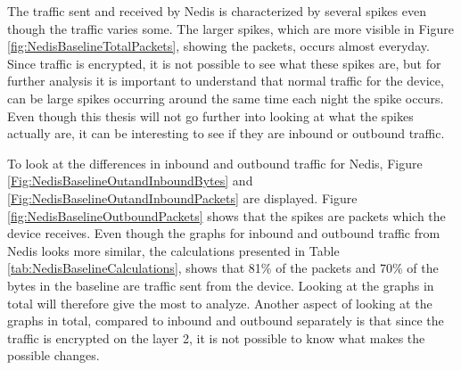 The traffic sent and received by Nedis is characterized by several spikes even though the traffic varies some. The larger spikes, which are more visible in Figure \ref{fig:NedisBaselineTotalPackets}, showing the packets, occurs almost everyday. Since traffic is encrypted, it is not possible to see what these spikes are, but for further analysis it is important to understand that normal traffic for the device, can be large spikes occurring around the same time each night the spike occurs. Even though this thesis will not go further into looking at what the spikes actually are, it can be interesting to see if they are inbound or outbound traffic. 

To look at the differences in inbound and outbound traffic for Nedis, Figure \ref{Fig:NedisBaselineOutandInboundBytes} and \ref{Fig:NedisBaselineOutandInboundPackets} are displayed. Figure \ref{fig:NedisBaselineOutboundPackets} shows that the spikes are packets which the device receives.
Even though the graphs for inbound and outbound traffic from Nedis looks more similar, the calculations presented in Table \ref{tab:NedisBaselineCalculations}, shows that 81\% of the packets and 70\% of the bytes in the baseline are traffic sent from the device. Looking at the graphs in total will therefore give the most to analyze. Another aspect of looking at the graphs in total, compared to inbound and outbound separately is that since the traffic is encrypted on the layer 2, it is not possible to know what makes the possible changes. 

